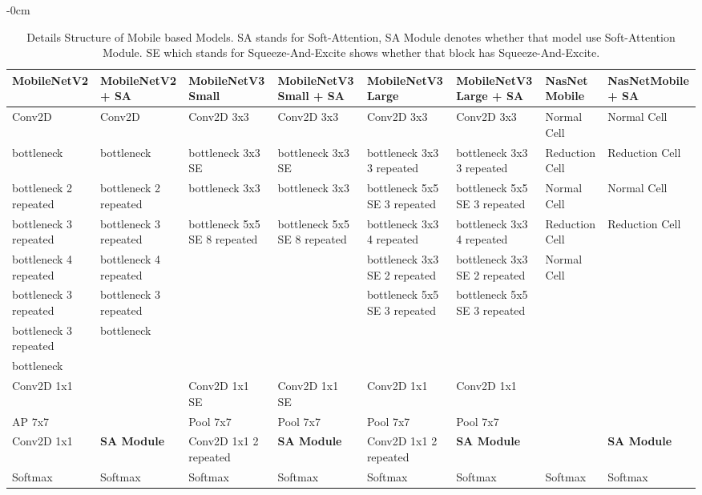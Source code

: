 \documentclass[sensors,article,submit,pdftex,moreauthors]{Definitions/mdpi}
\begin{document}
\begin{table}[H]
	\begin{adjustwidth}{-\extralength}{0cm}
		\begin{tabularx}{\fulllength}{p{1.8cm} | p{1.8cm} | p{1.9cm} | p{1.9cm} | p{1.9cm} | p{1.8cm} | p{1.8cm} | p{1.9cm}}
			\toprule
			\textbf{MobileNetV2} & \textbf{MobileNetV2 + SA} & \textbf{MobileNetV3 Small} & \textbf{MobileNetV3 Small + SA} & \textbf{MobileNetV3 Large} & \textbf{MobileNetV3 Large + SA} & \textbf{NasNet Mobile} & \textbf{NasNetMobile + SA}\\
			\midrule
			Conv2D & Conv2D& Conv2D 3x3& Conv2D 3x3& Conv2D 3x3& Conv2D 3x3 & Normal Cell & Normal Cell\\	\hline		
			bottleneck & bottleneck & bottleneck 3x3 SE& bottleneck 3x3 SE& bottleneck 3x3 3 repeated& bottleneck 3x3 3 repeated& Reduction Cell& Reduction Cell\\ \hline					
			bottleneck 2 repeated& bottleneck 2 repeated& bottleneck 3x3& bottleneck 3x3& bottleneck 5x5 SE 3 repeated& bottleneck 5x5 SE 3 repeated & Normal Cell & Normal Cell\\ \hline	
			bottleneck 3 repeated& bottleneck 3 repeated& bottleneck 5x5 SE 8 repeated& bottleneck 5x5 SE 8 repeated& bottleneck 3x3 4 repeated& bottleneck 3x3 4 repeated& Reduction Cell & Reduction Cell\\ \hline	
			bottleneck 4 repeated& bottleneck 4 repeated& & & bottleneck 3x3 SE 2 repeated& bottleneck 3x3 SE 2 repeated & Normal Cell\\ \hline	
			bottleneck 3 repeated& bottleneck 3 repeated& & & bottleneck 5x5 SE 3 repeated& bottleneck 5x5 SE 3 repeated& \\ \hline	
			bottleneck 3 repeated& bottleneck & & & & & \\ \hline	
			bottleneck & & & & & & \\ \hline
			Conv2D 1x1 & & Conv2D 1x1 SE & Conv2D 1x1 SE& Conv2D 1x1& Conv2D 1x1 & & \\ \hline
			AP 7x7 & & Pool 7x7& Pool 7x7& Pool 7x7& Pool 7x7& &\\ \hline
			Conv2D 1x1 & \textbf{SA Module}& Conv2D 1x1 2 repeated& \textbf{SA Module}& Conv2D 1x1 2 repeated& \textbf{SA Module}& &\textbf{SA Module}\\ \hline
			Softmax & Softmax& Softmax& Softmax& Softmax& Softmax& Softmax & Softmax\\ 
			\bottomrule
		\end{tabularx}
	\end{adjustwidth}
	\caption{Details Structure of Mobile based Models. SA stands for Soft-Attention, SA Module denotes whether that model use Soft-Attention Module. SE which stands for Squeeze-And-Excite shows whether that block has Squeeze-And-Excite. \label{appendix-table:detailed mobile model structure}}
\end{table}
\end{document}

